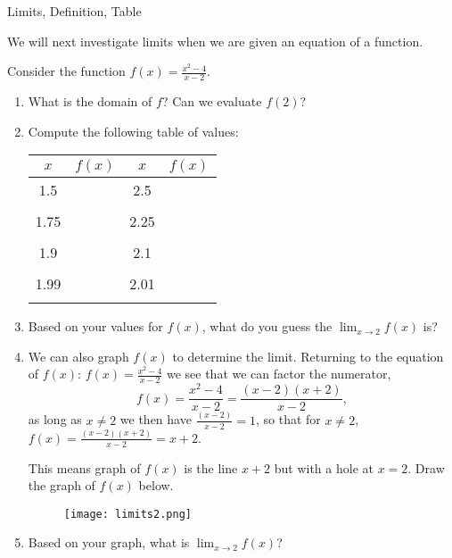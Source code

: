 \begin{tagblock}{Limits, Definition, Table}
\begin{question}
	We will next investigate limits when we are given an equation of a function.


\item Consider the function $\displaystyle f(x) = \frac{x^2-4}{x-2}$.  
\begin{enumerate}
\item What is the domain of $f$?  Can we evaluate $f(2)$?  
\bigskip

\item Compute the following table of values:


\begin{tabular}{c | c c | c  }
$x$ & $f(x)$  \hspace{2in} & $x$ & $f(x)$ \\ \hline
1.5 & \hspace{.5in} & 2.5 &  \\ &&& \\
1.75 & & 2.25  & \\ &&&\\
1.9 & & 2.1& \\&&& \\
1.99 && 2.01 &\\ &&&\\
\end{tabular}
  \item Based on your values for $f(x)$, what do you guess the $\displaystyle \lim_{x \to 2} f(x)$ is?
  
\vspace{.2in}

\item We can also graph $f(x)$ to determine the limit.  Returning to the equation of $f(x)$:  $\displaystyle f(x) = \frac{x^2-4}{x-2}$ we see that we can factor the numerator, \[\displaystyle f(x) = \frac{x^2-4}{x-2} = \frac{(x-2)(x+2)}{x-2},\]
as long as $x \neq 2$  we then have $ \displaystyle \frac{(x-2)}{x-2} =1$, so that for $x \neq 2$, $\displaystyle f(x) = \frac{(x-2)(x+2)}{x-2} = x+2$.  

This means graph of $f(x)$ is the line $x+2$ but with a hole at $x=2$.  Draw the graph of $f(x)$ below.   

\begin{figure}[h]
\centering
\texttt{[image: limits2.png]}
\end{figure}
\item Based on your graph, what is $\displaystyle \lim_{x \to 2} f(x)$?


\end{enumerate}
\end{question}
\end{tagblock}
